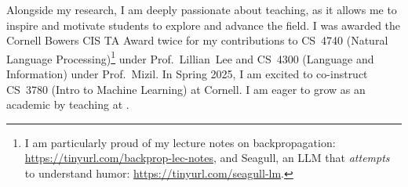 
Alongside my research, I am deeply passionate about teaching, as it allows me to inspire and motivate students to explore and advance the field.
%
I was awarded the Cornell Bowers CIS TA Award twice for my contributions to CS~4740 (Natural Language Processing)\footnote{I am particularly proud of my lecture notes on backpropagation: \url{https://tinyurl.com/backprop-lec-notes}, and Seagull, an LLM that \textit{attempts} to understand humor: \url{https://tinyurl.com/seagull-lm}.} under Prof.~Lillian~Lee and CS~4300 (Language and Information) under Prof.~Mizil. 
%
In Spring 2025, I am excited to co-instruct CS~3780 (Intro to Machine Learning) at Cornell.
%
I am eager to grow as an academic by teaching at \thecollegeabbr.
